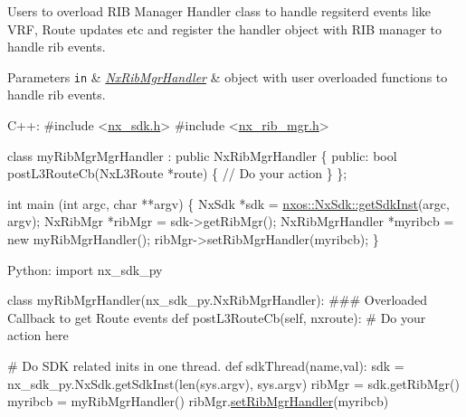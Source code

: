 Users to overload R\+IB Manager Handler class to handle regsiterd events like V\+RF, Route updates etc and register the handler object with R\+IB manager to handle rib events. 
\begin{DoxyParams}[1]{Parameters}
\mbox{\tt in}  & {\em \mbox{\hyperlink{classnxos_1_1_nx_rib_mgr_handler}{Nx\+Rib\+Mgr\+Handler}}} & object with user overloaded functions to handle rib events.\\
\hline
\end{DoxyParams}

\begin{DoxyCode}
C++:
\textcolor{preprocessor}{   #include <\mbox{\hyperlink{nx__sdk_8h}{nx\_sdk.h}}>}
\textcolor{preprocessor}{   #include <\mbox{\hyperlink{nx__rib__mgr_8h}{nx\_rib\_mgr.h}}>}

   \textcolor{keyword}{class }myRibMgrMgrHandler : \textcolor{keyword}{public} NxRibMgrHandler \{
      \textcolor{keyword}{public}:
         \textcolor{keywordtype}{bool} postL3RouteCb(NxL3Route *route) \{
              \textcolor{comment}{// Do your action}
         \}
   \};

   \textcolor{keywordtype}{int}  main (\textcolor{keywordtype}{int} argc, \textcolor{keywordtype}{char} **argv)
   \{
        NxSdk    *sdk = \mbox{\hyperlink{classnxos_1_1_nx_sdk_a5050e2d26c40744b4fc7862068a83f39}{nxos::NxSdk::getSdkInst}}(argc, argv);
        NxRibMgr *ribMgr = sdk->getRibMgr();
        NxRibMgrHandler *myribcb = \textcolor{keyword}{new} myRibMgrHandler();
        ribMgr->setRibMgrHandler(myribcb);
   \}

Python:
   \textcolor{keyword}{import} nx\_sdk\_py

   \textcolor{keyword}{class }myRibMgrHandler(nx\_sdk\_py.NxRibMgrHandler):
\textcolor{preprocessor}{   ### Overloaded Callback to get Route events}
         def postL3RouteCb(self, nxroute):
\textcolor{preprocessor}{             # Do your action here}

\textcolor{preprocessor}{   # Do SDK related inits in one thread.}
   def sdkThread(name,val):
       sdk = nx\_sdk\_py.NxSdk.getSdkInst(len(sys.argv), sys.argv)
       ribMgr = sdk.getRibMgr()
       myribcb = myRibMgrHandler()
       ribMgr.\mbox{\hyperlink{classnxos_1_1_nx_rib_mgr_ac42dd29e34f9c508614733dbec518b99}{setRibMgrHandler}}(myribcb)
\end{DoxyCode}
 \mbox{\label{classnxos_1_1_nx_rib_mgr_a1dc61ed1d830f50ea947707576d75b99}} 
